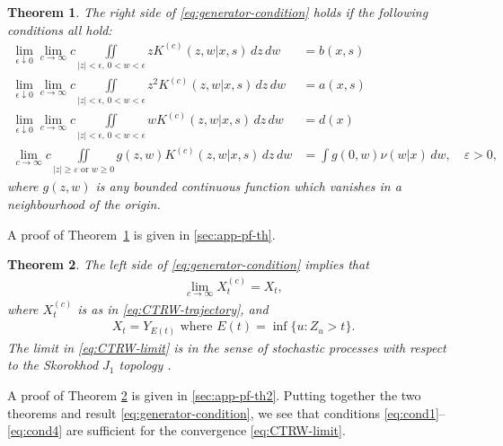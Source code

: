 \documentclass[a4paper,12pt]{elsarticle}
\numberwithin{equation}{section}
\theoremstyle{plain}
\newtheorem{theorem}{Theorem}[section]
\theoremstyle{definition}
\theoremstyle{remark}
\numberwithin{equation}{section}
\newcommand{\1}{\mathbf 1}
\begin{document}
\begin{theorem} \label{theorem1}
The right side of \eqref{eq:generator-condition} holds if the following 
conditions all hold: 
\begin{align} \label{eq:cond1}
\lim_{\epsilon \downarrow 0} \lim_{c \to \infty}
c \iint\limits_{|z|< \epsilon,\,0<  w < \epsilon} z K^{(c)}(z,w | x,s)\,dz\,dw &= b(x,s)
\\ \label{eq:cond2}
\lim_{\epsilon \downarrow 0} \lim_{c \to \infty}
c \iint\limits_{|z|< \epsilon, \,0<w < \epsilon} z^2 K^{(c)}(z,w | x,s)\,dz\,dw &= a(x,s)
\\ \label{eq:cond3}
\lim_{\epsilon \downarrow 0} \lim_{c \to \infty}
c \iint\limits_{|z|< \epsilon, \,0<w < \epsilon} w K^{(c)}(z,w | x,s)\,dz\,dw &= d(x)
\\
\label{eq:cond4}
\lim_{c \to \infty}
c \iint\limits_{|z| \ge \varepsilon \text{ or } w \ge 0} g(z,w) K^{(c)} (z,w | x,s)\,dz\,dw &= \int g(0,w) \nu(w|x)\,dw, \quad \varepsilon > 0,
\end{align}
where $g(z,w)$ is any bounded continuous function which vanishes in a neighbourhood of the origin. 
\end{theorem}
A proof of Theorem~\ref{theorem1} is given in \ref{sec:app-pf-th}. 

\begin{theorem} \label{th:continuous-mapping}
The left side of \eqref{eq:generator-condition} implies that 
\begin{align} \label{eq:CTRW-limit}
\lim_{c \to \infty} X^{(c)}_t = X_t,
\end{align}
where $X^{(c)}_t$ is as in \eqref{eq:CTRW-trajectory}, and
\begin{align} \label{eq:subordination}
X_t = Y_{E(t)} \text{ where } E(t) = \inf\{u: Z_u > t\}.
\end{align}
The limit in \eqref{eq:CTRW-limit} is in the sense of stochastic processes with respect to the Skorokhod $J_1$ topology \cite{Whitt2010}. 
\end{theorem}

A proof of Theorem \ref{th:continuous-mapping} is given in \ref{sec:app-pf-th2}.
Putting together the two theorems and result \eqref{eq:generator-condition}, 
we see that conditions \eqref{eq:cond1}--\eqref{eq:cond4} are sufficient for the 
convergence \eqref{eq:CTRW-limit}.
\end{document}
